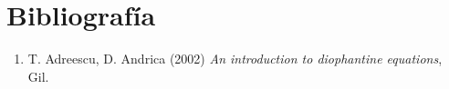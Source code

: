 \section*{Bibliografía}

{\small \begin{enumerate}
	\item T. Adreescu, D. Andrica (2002) \textit{An introduction to diophantine equations}, Gil.

	
\end{enumerate}}